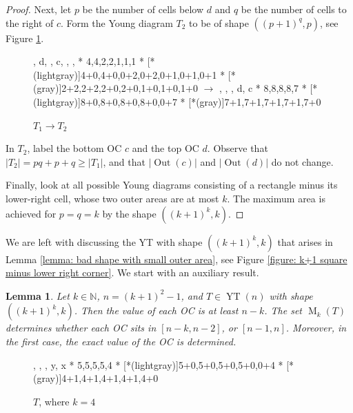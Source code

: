 \documentclass[12pt]{amsart}
\newtheorem{lemma}[theorem]{Lemma}
\theoremstyle{definition}
\theoremstyle{remark}
\numberwithin{equation}{section}
\numberwithin{figure}{section}
\newcommand{\YT}{\operatorname{YT}}
\newcommand{\M}{\operatorname{M}}
\newcommand{\Out}{\operatorname{Out}}
\newcommand{\N}{\mathbb{N}}
\begin{document}
\begin{proof}
    Next, let $p$ be the number of cells below $d$ and $q$ be the number of cells to the right of $c$. Form the Young diagram $T_2$ to be of shape
    $((p+1)^q,p)$, see Figure \ref{figure: move cells pic 2}.
    \begin{figure}[H]
    \centering
    \ytableaushort
        {\none, \none\none\none d, \none, \none c, \none, \none, \none }
        * {4,4,2,2,1,1,1}
        * [*(lightgray)]{4+0,4+0,0+2,0+2,0+1,0+1,0+1}
        * [*(gray)]{2+2,2+2,2+0,2+0,1+0,1+0,1+0}
    $\longrightarrow$ \;\;\;\;\;
    \ytableaushort
        {\none, \none, \none,
        \none\none\none\none\none\none\none d,
        \none\none\none\none\none\none c}
        * {8,8,8,8,7}
        * [*(lightgray)]{8+0,8+0,8+0,8+0,0+7}
        * [*(gray)]{7+1,7+1,7+1,7+1,7+0}
    \caption{$T_1 \longrightarrow T_2$}
    \label{figure: move cells pic 2}
    \end{figure}

    In $T_2$, label the bottom OC $c$ and the top OC $d$. Observe that $|T_2|=pq+p+q \geq |T_1|$,  and that
    $|\Out(c)|$ and $|\Out(d)|$ do not change.

    Finally, look at all possible Young diagrams consisting of a rectangle minus its lower-right cell, whose two outer areas are at most $k$. The maximum area is achieved for $p=q=k$ by the shape $((k+1)^k, k)$.
\end{proof}





We are left with discussing the YT with shape $((k+1)^k, k)$ that arises in Lemma \ref{lemma: bad shape with small outer area}, see Figure \ref{figure: k+1 square minus lower right corner}. We start with an auxiliary result.

\begin{lemma} \label{lemma: movement of n-k in column/row}
    Let $k\in\N$, $n = (k+1)^2 -1$, and $T\in\YT(n)$ with shape $((k+1)^k, k)$. Then the value of each OC is at least $n-k$. The set $\M_k(T)$ determines whether each OC sits in $[n-k,n-2]$, or $[n-1,n]$. Moreover, in the first case, the exact value of the OC is determined.
\end{lemma}

        \begin{figure}[H]
    \ytableaushort
        {\none, \none, \none,
        \none\none\none\none y,
        \none\none\none x}
        * {5,5,5,5,4}
        * [*(lightgray)]{5+0,5+0,5+0,5+0,0+4}
        * [*(gray)]{4+1,4+1,4+1,4+1,4+0}
    \caption{$T$, where $k=4$}
    \label{figure: T where k=4}
    \end{figure}
\end{document}

